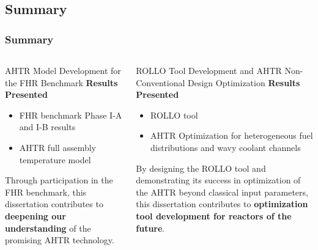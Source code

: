 \subsection*{Summary}
\begin{frame}
    \frametitle{Summary}
    \begin{columns}[t]
        \begin{column}{0.5\linewidth}
            \begin{block}{AHTR Model Development for the FHR Benchmark}
                \textbf{Results Presented} 
                \begin{itemize}
                    \item FHR benchmark Phase I-A and I-B results
                    \item AHTR full assembly temperature model 
                \end{itemize}

                \vspace{0.1cm}
                Through participation in the FHR benchmark, this dissertation contributes to 
                \textbf{deepening our understanding} of the promising \gls{AHTR} technology.
            \end{block}
        \end{column}
        \begin{column}{0.5\linewidth}
            \begin{block}{ROLLO Tool Development and AHTR Non-Conventional Design Optimization}
                \textbf{Results Presented}
                \begin{itemize}
                    \item \acrfull{ROLLO} tool 
                    \item AHTR Optimization for heterogeneous fuel distributions and wavy 
                    coolant channels 
                \end{itemize}
                
                \vspace{0.1cm}
                By designing the ROLLO tool and demonstrating its success in 
                optimization of the \gls{AHTR} beyond classical input parameters, this dissertation 
                contributes to \textbf{optimization tool development for reactors of the future}.
            \end{block}
        \end{column}
    \end{columns}
\end{frame}

